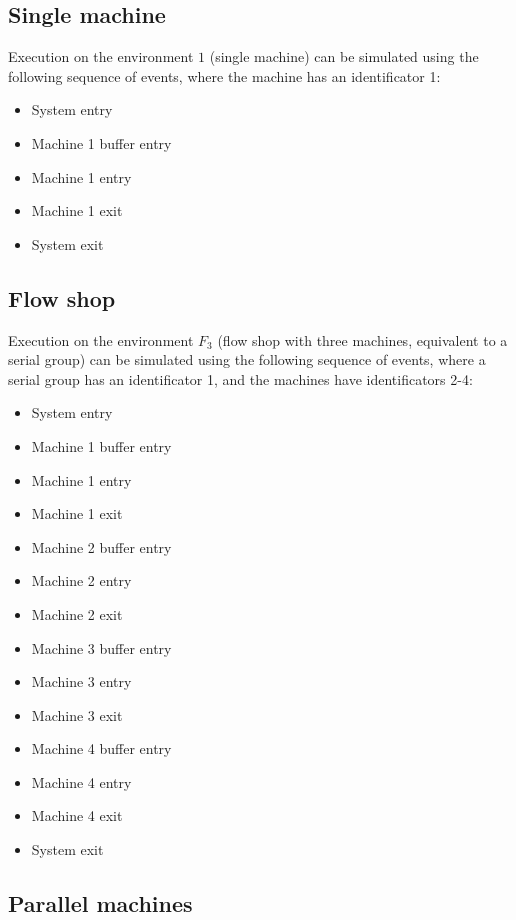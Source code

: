 \subsection{Single machine}

Execution on the environment $1$ (single machine) can be simulated using the following sequence of events, where the machine has an identificator 1:
\begin{itemize}
    \item System entry
    \item Machine 1 buffer entry
    \item Machine 1 entry
    \item Machine 1 exit
    \item System exit
  \end{itemize}

\subsection{Flow shop}

Execution on the environment $F_3$ (flow shop with three machines, equivalent to a serial group) can be simulated using the following sequence of events, where a serial group has an identificator 1, and the machines have identificators 2-4:
\begin{itemize}
    \item System entry
    \item Machine 1 buffer entry
    \item Machine 1 entry
    \item Machine 1 exit
    \item Machine 2 buffer entry
    \item Machine 2 entry
    \item Machine 2 exit
    \item Machine 3 buffer entry
    \item Machine 3 entry
    \item Machine 3 exit
    \item Machine 4 buffer entry
    \item Machine 4 entry
    \item Machine 4 exit
    \item System exit
  \end{itemize}

\subsection{Parallel machines}

